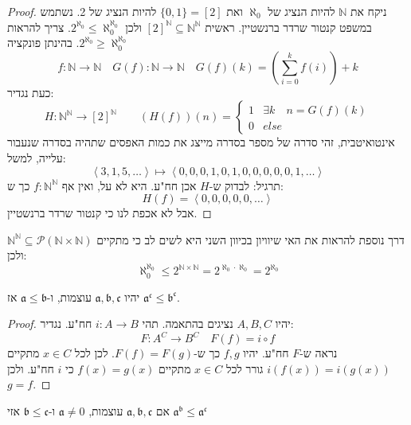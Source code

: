 \documentclass{tstextbook}
\begin{document}
\begin{proof}
ניקח את \(\mathbb{N}\) להיות הנציג של \(\aleph_{0}\) ואת \(\{ 0,1 \}=[2]\) להיות הנציג של 2.
נשתמש במשפט קנטור שרדר ברנשטיין. ראשית \([2]^\mathbb{N}\subseteq \mathbb{N}^\mathbb{N}\) ולכן \(2^{\aleph_{0}}\leq \aleph_{0}^{\aleph_{0}}\). צריך להראות  \(2^{\aleph_{0}}\geq \aleph_{0}^{\aleph_{0}}\). בהינתן פונקציה 
$$f:\mathbb{N}\to \mathbb{N}\quad G(f):\mathbb{N}\to \mathbb{N}\quad G(f)(k)=\left( \sum_{i=0}^k f(i) \right)+k$$
כעת נגדיר:
$$H:\mathbb{N}^\mathbb{N} \to [2]^\mathbb{N}\qquad (H(f))(n)=\begin{cases}1 &  \exists k\quad n=G(f)(k) \\0 & else
\end{cases}$$
אינטואיטבית, זהי סדרה של מספר בסדרה מייצג את כמות האפסים שתהיה בסדרה שנעבור עלייה, למשל:
$$\left\langle  3,1,5,\dots  \right\rangle \mapsto \left\langle  0,0,0,1,0,1,0,0,0,0,0,1,\dots  \right\rangle$$
תרגיל: לבדוק ש-\(H\) אכן חח"ע. היא לא על, ואין אף \(f:\mathbb{N}^\mathbb{N}\) כך ש:
$$H(f)=\left\langle  0,0,0,0,0,\dots  \right\rangle $$
אבל לא אכפת לנו כי קנטור שרדר ברנשטיין. 

\end{proof}
\begin{remark}
דרך נוספת להראות את האי שיוויון בכיוון השני היא לשים לב כי מתקיים \(\mathbb{N}^\mathbb{N}\subseteq \mathcal{P}\left( \mathbb{N}\times \mathbb{N} \right)\) ולכן:
$$\aleph_{0}^{\aleph_{0}}\leq 2^{\mathbb{N}\times \mathbb{N}}=2^{\aleph_{0}\cdot \aleph_{0}}=2^{\aleph_{0}}$$

\end{remark}
\begin{proposition}
יהיו \(\mathfrak{a,b,c}\) עוצמות, ו-\(\mathfrak{a\leq b}\) אז \(\mathfrak{a^c\leq b^c}\).

\end{proposition}
\begin{proof}
יהיו \(A,B,C\) נציגים בהתאמה. תהי \(i:A\to B\) חח"ע. נגדיר:
$$F:A^C\to B^C\quad F(f)=i\circ f$$
נראה ש-\(F\) חח"ע. יהיו \(f,g\) כך ש-\(F(f)=F(g)\). 
לכן לכל \(x \in C\) מתקיים \(i(f(x))=i(g(x))\) גורר לכל \(x \in C\) מתקיים \(f(x)=g(x)\) כי \(i\) חח"ע. ולכן \(g=f\).

\end{proof}
\begin{proposition}
אם \(\mathfrak{a,b,c}\) עוצמות, \(\mathfrak{a}\neq 0\) ו-\(\mathfrak{b\leq c}\) אזי \(\mathfrak{a^b\leq a^c}\)

\end{proposition}
\end{document}
